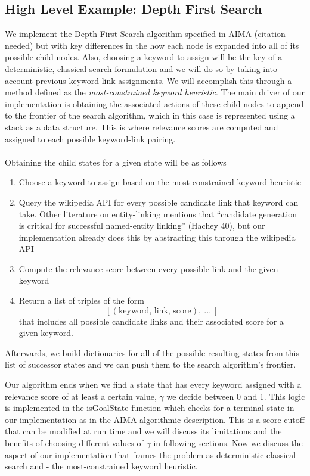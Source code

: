 \documentclass[twoside,11pt]{article}
\begin{document}
\subsection{High Level Example: Depth First Search}

We implement the Depth First Search algorithm specified in AIMA (citation needed) but with key differences in the how each node is expanded into all of its possible child nodes. Also, choosing a keyword to assign will be the key of a deterministic, classical search formulation and we will do so by taking into account previous keyword-link assignments. We will accomplish this through a method defined as the \textit{most-constrained keyword heuristic}. The main driver of our implementation is obtaining the associated actions of these child nodes to append to the frontier of the search algorithm, which in this case is represented using a stack as a data structure. This is where relevance scores are computed and assigned to each possible keyword-link pairing.
\\ \\
Obtaining the child states for a given state will be as follows

\begin{enumerate}
  \item Choose a keyword to assign based on the most-constrained keyword heuristic
  \item Query the wikipedia API for every possible candidate link that keyword can take. Other literature on entity-linking mentions that “candidate generation is critical for successful named-entity linking” (Hachey 40), but our implementation already does this by abstracting this through the wikipedia API
  \item Compute the relevance score between every possible link and the given keyword
  \item Return a list of triples of the form $$[(\mbox{keyword, link, score}), \ ... \ ]$$ that includes all possible candidate links and their associated score for a given keyword.
\end{enumerate}
Afterwards, we build dictionaries for all of the possible resulting states from this list of successor states and we can push them to the search algorithm’s frontier.

Our algorithm ends when we find a state that has every keyword assigned with a relevance score of at least a certain value, $\gamma$ we decide between 0 and 1. This logic is implemented in the {\sc isGoalState} function which checks for a terminal state in our implementation as in the AIMA algorithmic description. This is a score cutoff that can be modified at run time and we will discuss its limitations and the benefits of choosing different values of $\gamma$ in following sections. Now we discuss the aspect of our implementation that frames the problem as deterministic classical search and - the most-constrained keyword heuristic.
\end{document}

